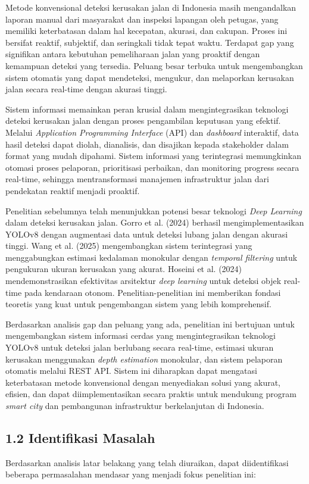 \documentclass[12pt,a4paper]{article}
\begin{document}
Metode konvensional deteksi kerusakan jalan di Indonesia masih mengandalkan laporan manual dari masyarakat dan inspeksi lapangan oleh petugas, yang memiliki keterbatasan dalam hal kecepatan, akurasi, dan cakupan. Proses ini bersifat reaktif, subjektif, dan seringkali tidak tepat waktu. Terdapat gap yang signifikan antara kebutuhan pemeliharaan jalan yang proaktif dengan kemampuan deteksi yang tersedia. Peluang besar terbuka untuk mengembangkan sistem otomatis yang dapat mendeteksi, mengukur, dan melaporkan kerusakan jalan secara real-time dengan akurasi tinggi.

Sistem informasi memainkan peran krusial dalam mengintegrasikan teknologi deteksi kerusakan jalan dengan proses pengambilan keputusan yang efektif. Melalui \textit{Application Programming Interface} (API) dan \textit{dashboard} interaktif, data hasil deteksi dapat diolah, dianalisis, dan disajikan kepada stakeholder dalam format yang mudah dipahami. Sistem informasi yang terintegrasi memungkinkan otomasi proses pelaporan, prioritisasi perbaikan, dan monitoring progress secara real-time, sehingga mentransformasi manajemen infrastruktur jalan dari pendekatan reaktif menjadi proaktif.

Penelitian sebelumnya telah menunjukkan potensi besar teknologi \textit{Deep Learning} dalam deteksi kerusakan jalan. Gorro et al. (2024) berhasil mengimplementasikan YOLOv8 dengan augmentasi data untuk deteksi lubang jalan dengan akurasi tinggi. Wang et al. (2025) mengembangkan sistem terintegrasi yang menggabungkan estimasi kedalaman monokular dengan \textit{temporal filtering} untuk pengukuran ukuran kerusakan yang akurat. Hoseini et al. (2024) mendemonstrasikan efektivitas arsitektur \textit{deep learning} untuk deteksi objek real-time pada kendaraan otonom. Penelitian-penelitian ini memberikan fondasi teoretis yang kuat untuk pengembangan sistem yang lebih komprehensif.

Berdasarkan analisis gap dan peluang yang ada, penelitian ini bertujuan untuk mengembangkan sistem informasi cerdas yang mengintegrasikan teknologi YOLOv8 untuk deteksi jalan berlubang secara real-time, estimasi ukuran kerusakan menggunakan \textit{depth estimation} monokular, dan sistem pelaporan otomatis melalui REST API. Sistem ini diharapkan dapat mengatasi keterbatasan metode konvensional dengan menyediakan solusi yang akurat, efisien, dan dapat diimplementasikan secara praktis untuk mendukung program \textit{smart city} dan pembangunan infrastruktur berkelanjutan di Indonesia.

\subsection*{1.2 Identifikasi Masalah}
Berdasarkan analisis latar belakang yang telah diuraikan, dapat diidentifikasi beberapa permasalahan mendasar yang menjadi fokus penelitian ini:
\end{document}

